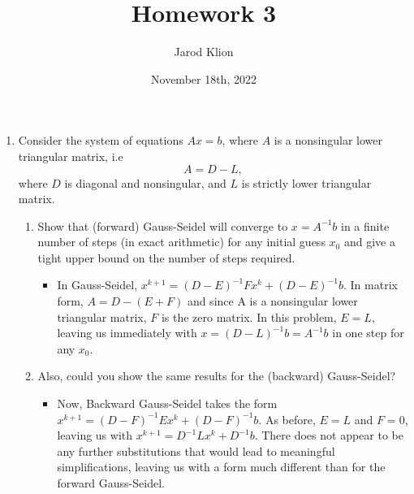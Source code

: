 \documentclass[10pt]{article}
\title{Homework 3}
\author{Jarod Klion}
\date{November 18th, 2022}
\begin{document}
\maketitle



\begin{enumerate} 
\item Consider the system of equations $Ax = b$, where $A$ is a nonsingular lower triangular matrix, i.e 
	$$A = D - L,$$ 
	where $D$ is diagonal and nonsingular, and $L$ is strictly lower triangular matrix.
	\begin{enumerate}[label=(\alph*)]
		\item Show that (forward) Gauss-Seidel will converge to $x = A^{-1}b$ in a finite number of steps (in exact arithmetic) for any initial guess $x_0$ and give a tight upper bound on the number of steps required.
		\begin{itemize}
			\item In Gauss-Seidel, $x^{k+1} = (D - E)^{-1}Fx^k + (D-E)^{-1}b$. In matrix form, $A = D - (E + F)$ and since A is a nonsingular lower triangular matrix, $F$ is the zero matrix. In this problem, $E = L$, leaving us immediately with $x = (D-L)^{-1}b =  A^{-1}b$ in one step for any $x_0$.
		\end{itemize}
		\item Also, could you show the same results for the (backward) Gauss-Seidel?
		\begin{itemize}
			\item Now, Backward Gauss-Seidel takes the form $x^{k+1} =(D-F)^{-1}Ex^k + (D-F)^{-1}b$. As before, $E=L$ and $F=0$, leaving us with $x^{k+1} = D^{-1}Lx^k + D^{-1}b$. There does not appear to be any further substitutions that would lead to meaningful simplifications, leaving us with a form much different than for the forward Gauss-Seidel.
		\end{itemize}
	\end{enumerate}
\clearpage



\end{enumerate}
\end{document}
